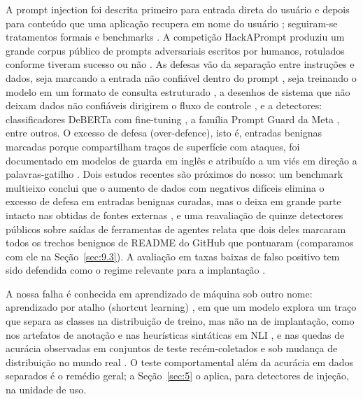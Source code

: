 \documentclass[11pt]{article}
\begin{document}
A prompt injection foi descrita primeiro para entrada direta do usuário \citep{perez2022ignore} e depois para conteúdo que uma aplicação recupera em nome do usuário \citep{greshake2023indirect}; seguiram-se tratamentos formais e benchmarks \citep{liu2024formalizing, yi2023bipia, zhan2024injecagent, debenedetti2024agentdojo}. A competição HackAPrompt produziu um grande corpus público de prompts adversariais escritos por humanos, rotulados conforme tiveram sucesso ou não \citep{schulhoff2023hackaprompt}. As defesas vão da separação entre instruções e dados, seja marcando a entrada não confiável dentro do prompt \citep{hines2024spotlighting}, seja treinando o modelo em um formato de consulta estruturado \citep{chen2024struq}, a desenhos de sistema que não deixam dados não confiáveis dirigirem o fluxo de controle \citep{debenedetti2025camel}, e a detectores: classificadores DeBERTa com fine-tuning \citep{protectai2024deberta, deepset2023deberta}, a família Prompt Guard da Meta \citep{meta2024promptguard, meta2025promptguard2}, entre outros. O excesso de defesa (over-defence), isto é, entradas benignas marcadas porque compartilham traços de superfície com ataques, foi documentado em modelos de guarda em inglês e atribuído a um viés em direção a palavras-gatilho \citep{li2024injecguard, li2025piguard}. Dois estudos recentes são próximos do nosso: um benchmark multieixo conclui que o aumento de dados com negativos difíceis elimina o excesso de defesa em entradas benignas curadas, mas o deixa em grande parte intacto nas obtidas de fontes externas \citep{shire2026pidsbench}, e uma reavaliação de quinze detectores públicos sobre saídas de ferramentas de agentes relata que dois deles marcaram todos os trechos benignos de README do GitHub que pontuaram \citep{liu2026passing} (comparamos com ele na Seção~\ref{sec:9.3}). A avaliação em taxas baixas de falso positivo tem sido defendida como o regime relevante para a implantação \citep{jacob2025promptshield, liu2026passing}. %

A nossa falha é conhecida em aprendizado de máquina sob outro nome: aprendizado por atalho (shortcut learning) \citep{geirhos2020shortcut}, em que um modelo explora um traço que separa as classes na distribuição de treino, mas não na de implantação, como nos artefatos de anotação e nas heurísticas sintáticas em NLI \citep{gururangan2018annotation, mccoy2019right}, e nas quedas de acurácia observadas em conjuntos de teste recém-coletados e sob mudança de distribuição no mundo real \citep{recht2019imagenet, koh2021wilds}. O teste comportamental além da acurácia em dados separados \citep{ribeiro2020checklist} é o remédio geral; a Seção~\ref{sec:5} o aplica, para detectores de injeção, na unidade de uso.
\end{document}

